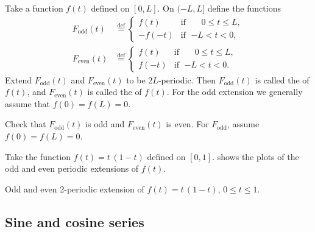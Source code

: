 Take a function $f(t)$ defined on $[0,L]$.  On $(-L,L]$ define the functions
\begin{align*}
F_{\text{odd}}(t) & \overset{\text{def}}{=}
\begin{cases}
f(t) & \text{if } \; \phantom{-}0 \leq t \leq L , \\
-f(-t) & \text{if } \; {-L} < t < 0 ,
\end{cases}
\\
F_{\text{even}}(t) & \overset{\text{def}}{=}
\begin{cases}
f(t) & \text{if } \; \phantom{-}0 \leq t \leq L , \\
f(-t) & \text{if } \; {-L} < t < 0 .
\end{cases}
\end{align*}
Extend $F_{\text{odd}}(t)$ and $F_{\text{even}}(t)$ to be $2L$-periodic.
Then
$F_{\text{odd}}(t)$ is called
the \emph{} of $f(t)$, and
$F_{\text{even}}(t)$ is called the
\emph{} of $f(t)$.
For the odd extension we generally assume that $f(0) = f(L) = 0$.

\begin{exercise}
Check that $F_{\text{odd}}(t)$ is odd and $F_{\text{even}}(t)$ is even.
For $F_{\text{odd}}$,
assume $f(0) = f(L) = 0$.
\end{exercise}

\begin{example}
Take the function $f(t) = t\,(1-t)$ defined on $[0,1]$. 
shows the plots of the odd and even periodic extensions of $f(t)$.

\begin{myfig}
\capstart
\caption{Odd and even 2-periodic extension of $f(t) =
t\,(1-t)$, $0 \leq t \leq 1$.\label{scs:oddevenextfig}}
\end{myfig}
\end{example}

\subsection{Sine and cosine series}

